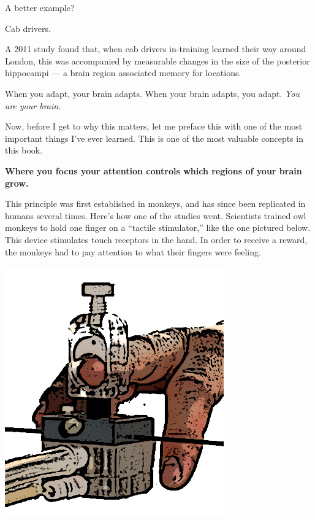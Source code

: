 A better example?

Cab drivers.

A 2011 study found that, when cab drivers in-training learned their way around
London, this was accompanied by measurable changes in the size of the posterior
hippocampi --- a brain region associated memory for locations. \cite{woollett2011acquiring}

When you adapt, your brain adapts. When your brain adapts, you adapt. \textit{You are
your brain.}

Now, before I get to why this matters, let me preface this with one of the most
important things I've ever learned. This is one of the most valuable concepts in this
book. 

\textbf{Where you focus your attention controls which regions of your brain
  grow.}

This principle was first established in monkeys, and has since been replicated
in humans several times.\cite{heron2010attention}\cite{stefan2004modulation} Here's how one of the studies\cite{recanzone1992topographic} went. Scientists trained owl
monkeys to hold one finger on a ``tactile stimulator,'' like the one pictured below. This
device stimulates touch receptors in the hand. In order to receive a reward, the monkeys
had to pay attention to what their fingers were feeling.

\includegraphics[width=\textwidth]{graphics/tactile-simulator.jpg}

